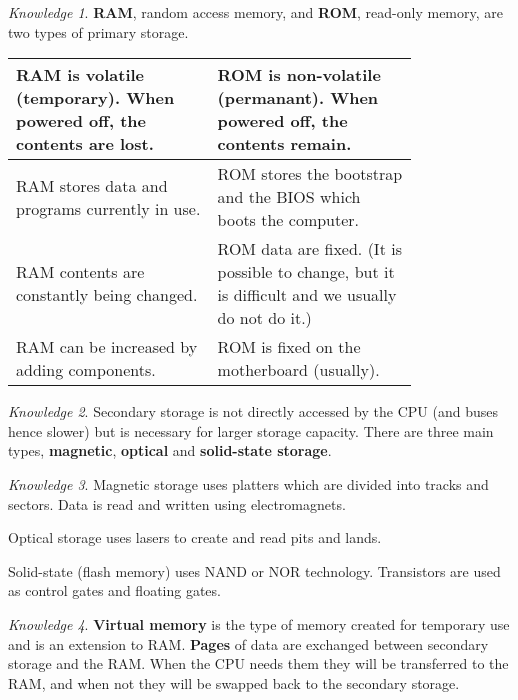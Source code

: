 \documentclass[8pt]{article}
\theoremstyle{remark}
\newtheorem{knowledge}{Knowledge}[subsection]
\begin{document}
            \begin{knowledge}
                \textbf{RAM}, random access memory, and \textbf{ROM}, read-only memory, are two types of primary storage.

                \begin{center}
                    \begin{tabular}{p{0.4\linewidth}|p{0.4\linewidth}}
                        RAM is volatile (temporary). When powered off, the contents are lost. & ROM is non-volatile (permanant). When powered off, the contents remain.\\\hline
                        RAM stores data and programs currently in use. & ROM stores the bootstrap and the BIOS which boots the computer.\\\hline
                        RAM contents are constantly being changed. & ROM data are fixed. (It is possible to change, but it is difficult and we usually do not do it.)\\\hline
                        RAM can be increased by adding components. & ROM is fixed on the motherboard (usually).
                    \end{tabular}
                \end{center}
            \end{knowledge}

            \begin{knowledge}
                Secondary storage is not directly accessed by the CPU (and buses hence slower) but is necessary for larger storage capacity. There are three main types, \textbf{magnetic}, \textbf{optical} and \textbf{solid-state storage}.
            \end{knowledge}

            \begin{knowledge}
                Magnetic storage uses platters which are divided into tracks and sectors. Data is read and written using electromagnets.
                
                Optical storage uses lasers to create and read pits and lands.
                
                Solid-state (flash memory) uses NAND or NOR technology. Transistors are used as control gates and floating gates.
            \end{knowledge}

            \begin{knowledge}
                \textbf{Virtual memory} is the type of memory created for temporary use and is an extension to RAM. \textbf{Pages} of data are exchanged between secondary storage and the RAM. When the CPU needs them they will be transferred to the RAM, and when not they will be swapped back to the secondary storage.
            \end{knowledge}
\end{document}
